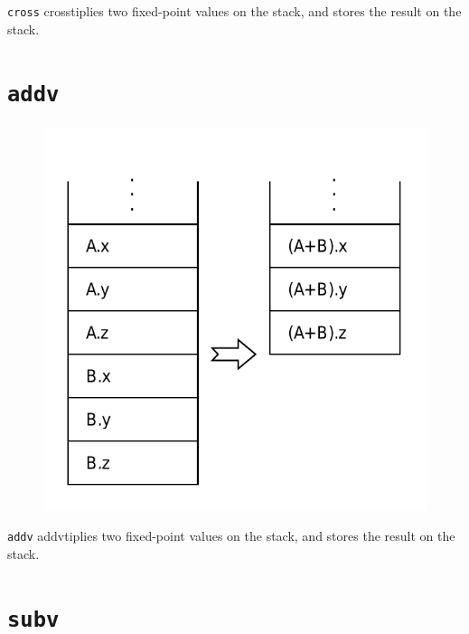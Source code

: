 		\texttt{cross} crosstiplies two fixed-point values on the stack, and stores
		the result on the stack.

\section*{\texttt{addv}}

	\begin{figure}
		\begin{flushright}
			\includegraphics[width=0.9\linewidth]{figure/pdf/i_addv} 
		\end{flushright}
	\end{figure}

		\texttt{addv} addvtiplies two fixed-point values on the stack, and stores
		the result on the stack.

\section*{\texttt{subv}}

